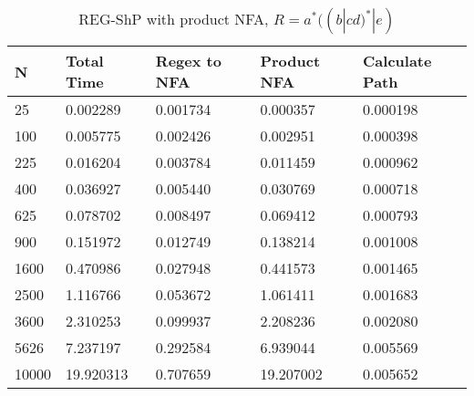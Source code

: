 \documentclass[]{article}
\numberwithin{equation}{section}
\begin{document}
\begin{appendices}
\begin{table}[H]
	\centering
	\small
	\setlength\tabcolsep{2pt}
	\begin{tabular}{|l|l|l|l|l|}
		\hline
		N     & Total Time & Regex to NFA & Product NFA & Calculate Path \\ \hline
		25    & 0.002289   & 0.001734     & 0.000357    & 0.000198       \\ \hline
		100   & 0.005775   & 0.002426     & 0.002951    & 0.000398       \\ \hline
		225   & 0.016204   & 0.003784     & 0.011459    & 0.000962       \\ \hline
		400   & 0.036927   & 0.005440     & 0.030769    & 0.000718       \\ \hline
		625   & 0.078702   & 0.008497     & 0.069412    & 0.000793       \\ \hline
		900   & 0.151972   & 0.012749     & 0.138214    & 0.001008       \\ \hline
		1600  & 0.470986   & 0.027948     & 0.441573    & 0.001465       \\ \hline
		2500  & 1.116766   & 0.053672     & 1.061411    & 0.001683       \\ \hline
		3600  & 2.310253   & 0.099937     & 2.208236    & 0.002080       \\ \hline
		5626  & 7.237197   & 0.292584     & 6.939044    & 0.005569       \\ \hline
		10000 & 19.920313  & 0.707659     & 19.207002   & 0.005652       \\ \hline
	\end{tabular}
	\caption{REG-ShP with product NFA, $R = a^*((b|cd)^*|e)$}
\end{table}


\end{appendices}
\end{document}

